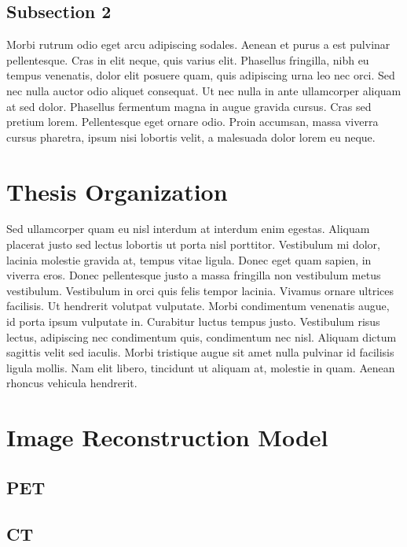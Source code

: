 \subsection{Subsection 2}
Morbi rutrum odio eget arcu adipiscing sodales. Aenean et purus a est pulvinar pellentesque. Cras in elit neque, quis varius elit. Phasellus fringilla, nibh eu tempus venenatis, dolor elit posuere quam, quis adipiscing urna leo nec orci. Sed nec nulla auctor odio aliquet consequat. Ut nec nulla in ante ullamcorper aliquam at sed dolor. Phasellus fermentum magna in augue gravida cursus. Cras sed pretium lorem. Pellentesque eget ornare odio. Proin accumsan, massa viverra cursus pharetra, ipsum nisi lobortis velit, a malesuada dolor lorem eu neque.


\section{Thesis Organization}

Sed ullamcorper quam eu nisl interdum at interdum enim egestas. Aliquam placerat justo sed lectus lobortis ut porta nisl porttitor. Vestibulum mi dolor, lacinia molestie gravida at, tempus vitae ligula. Donec eget quam sapien, in viverra eros. Donec pellentesque justo a massa fringilla non vestibulum metus vestibulum. Vestibulum in orci quis felis tempor lacinia. Vivamus ornare ultrices facilisis. Ut hendrerit volutpat vulputate. Morbi condimentum venenatis augue, id porta ipsum vulputate in. Curabitur luctus tempus justo. Vestibulum risus lectus, adipiscing nec condimentum quis, condimentum nec nisl. Aliquam dictum sagittis velit sed iaculis. Morbi tristique augue sit amet nulla pulvinar id facilisis ligula mollis. Nam elit libero, tincidunt ut aliquam at, molestie in quam. Aenean rhoncus vehicula hendrerit.



\section{Image Reconstruction Model}



\subsection{PET}


\subsection{CT}








